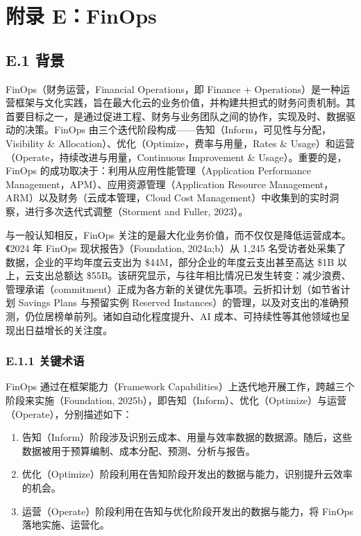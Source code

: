 \section{附录 E：FinOps}

\subsection{E.1 背景}

FinOps（财务运营，Financial Operations，即 Finance + Operations）是一种运营框架与文化实践，旨在最大化云的业务价值，并构建共担式的财务问责机制。其首要目标之一，是通过促进工程、财务与业务团队之间的协作，实现及时、数据驱动的决策。FinOps 由三个迭代阶段构成——告知（Inform，可见性与分配，Visibility \& Allocation）、优化（Optimize，费率与用量，Rates \& Usage）和运营（Operate，持续改进与用量，Continuous Improvement \& Usage）。重要的是，FinOps 的成功取决于：利用从应用性能管理（Application Performance Management，APM）、应用资源管理（Application Resource Management，ARM）以及财务（云成本管理，Cloud Cost Management）中收集到的实时洞察，进行多次迭代式调整（Storment and Fuller, 2023）。

与一般认知相反，FinOps 关注的是最大化业务价值，而不仅仅是降低运营成本。《2024 年 FinOps 现状报告》（Foundation, 2024a;b）从 1,245 名受访者处采集了数据，企业的平均年度云支出为 \$44M，部分企业的年度云支出甚至高达 \$1B 以上，云支出总额达 \$55B。该研究显示，与往年相比情况已发生转变：减少浪费、管理承诺（commitment）正成为各方新的关键优先事项。云折扣计划（如节省计划 Savings Plans 与预留实例 Reserved Instances）的管理，以及对支出的准确预测，仍位居榜单前列。诸如自动化程度提升、AI 成本、可持续性等其他领域也呈现出日益增长的关注度。

\subsubsection*{E.1.1 关键术语}

FinOps 通过在框架能力（Framework Capabilities）上迭代地开展工作，跨越三个阶段来实施（Foundation, 2025b），即告知（Inform）、优化（Optimize）与运营（Operate），分别描述如下：

\begin{enumerate}
\item 告知（Inform）阶段涉及识别云成本、用量与效率数据的数据源。随后，这些数据被用于预算编制、成本分配、预测、分析与报告。
\item 优化（Optimize）阶段利用在告知阶段开发出的数据与能力，识别提升云效率的机会。
\item 运营（Operate）阶段利用在告知与优化阶段开发出的数据与能力，将 FinOps 落地实施、运营化。
\end{enumerate}

